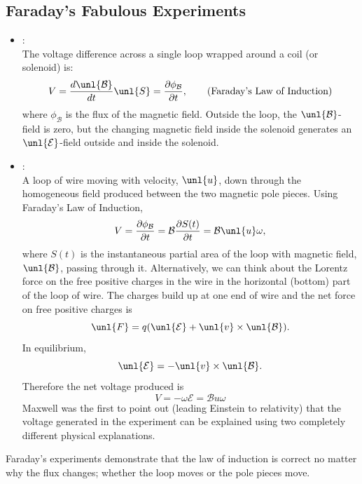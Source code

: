 \documentclass[a4paper, 11pt, normalem]{report}
\newcommand\p{\partial}
\newcommand\E{\mathcal{E}}
\newcommand\uE{\unl{\E}}
\newcommand\B{\mathcal{B}}
\newcommand\uB{\unl{\B}}
\begin{document}
\subsection{Faraday's Fabulous Experiments}
\begin{itemize}
    \item {}: \\
    The voltage difference across a single loop wrapped around a coil (or solenoid) is:
    \begin{equation}
        V = \frac{d\uB}{dt}\unl{S} = \frac{\p \phi_{\B}}{\p t}, \tag{Faraday's Law of Induction}
    \end{equation}
    where $\phi_\B$ is the flux of the magnetic field.
    Outside the loop, the $\uB$-field is zero, but the changing magnetic field inside the solenoid generates an $\uE$-field outside and inside the solenoid.
    \item {}: \\
    A loop of wire moving with velocity, $\unl{u}$, down through the homogeneous field produced between the two magnetic pole pieces.
    Using Faraday's Law of Induction,
    \begin{equation}
        V = \frac{\p \phi_{\B}}{\p t} = \B\frac{\p S(t)}{\p t} = \B\unl{u}\omega,
    \end{equation}
    where $S(t)$ is the instantaneous partial area of the loop with magnetic field, $\uB$, passing through it.
    Alternatively, we can think about the Lorentz force on the free positive charges in the wire in the horizontal (bottom) part of the loop of wire.
    The charges build up at one end of wire and the net force on free positive charges is
    \begin{equation}
        \unl{F} = q(\uE + \unl{v}\times\uB).
    \end{equation}
    In equilibrium,
    \begin{equation}
        \uE = -\unl{v}\times\uB.
    \end{equation}
    Therefore the net voltage produced is
    \begin{equation}
        V = -\omega \E = \B u \omega
    \end{equation}
    Maxwell was the first to point out (leading Einstein to relativity) that the voltage generated in the experiment can be explained using two completely different physical explanations.
\end{itemize}
Faraday's experiments demonstrate that the law of induction is correct no matter why the flux changes; whether the loop moves or the pole pieces move.
\end{document}
